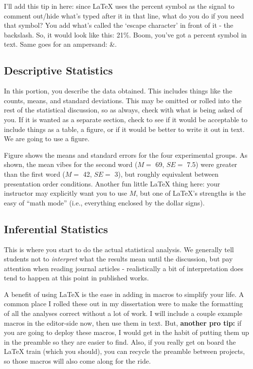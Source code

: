 \documentclass[stu,12pt,floatsintext]{apa7}
\begin{document}
I'll add this tip in here: since \LaTeX{} uses the percent symbol as the signal to comment out/hide what's typed after it in that line, what do you do if you need that symbol? You add what's called the `escape character' in front of it - the backslash. So, it would look like this: 21\%. Boom, you've got a percent symbol in text. Same goes for an ampersand: \&.

\subsection{Descriptive Statistics}

In this portion, you describe the data obtained. This includes things like the counts, means, and standard deviations. This may be omitted or rolled into the rest of the statistical discussion, so as always, check with what is being asked of you. If it is wanted as a separate section, check to see if it would be acceptable to include things as a table, a figure, or if it would be better to write it out in text. We are going to use a figure.



Figure shows the means and standard errors for the four experimental groups. As shown, the mean vibes for the second word ($M = $ 69, $SE = $ 7.5) were greater than the first word ($M = $ 42, $SE = $ 3), but roughly equivalent between presentation order conditions. Another fun little \LaTeX{} thing here: your instructor may explicitly want you to use $M$, but one of \LaTeX{}'s strengths is the easy of ``math mode'' (i.e., everything enclosed by the dollar signs). %

\subsection{Inferential Statistics}

This is where you start to do the actual statistical analysis. We generally tell students not to \textit{interpret} what the results mean until the discussion, but pay attention when reading journal articles - realistically a bit of interpretation does tend to happen at this point in published works.

A benefit of using \LaTeX{} is the ease in adding in macros to simplify your life. A common place I rolled these out in my dissertation were to make the formatting of all the analyses correct without a lot of work. I will include a couple example macros in the editor-side now, then use them in text. But, \textbf{another pro tip:} if you are going to deploy these macros, I would get in the habit of putting them up in the preamble so they are easier to find. Also, if you really get on board the \LaTeX{} train (which you should), you can recycle the preamble between projects, so those macros will also come along for the ride.
\end{document}
